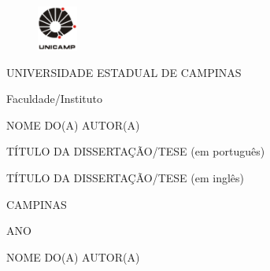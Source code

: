 
\thispagestyle{empty}

\begin{figure}[t]
  \begin{flushleft}
  \includegraphics[width=50px,height=56px]{logo_unicamp.pdf}
  \end{flushleft}
\end{figure}

\begin{center}
UNIVERSIDADE ESTADUAL DE CAMPINAS

Faculdade/Instituto
\end{center}

\vspace{\fill}

\begin{center}
NOME DO(A) AUTOR(A)
\end{center}

\vspace{\fill}

\begin{center}
TÍTULO DA DISSERTAÇÃO/TESE (em português)
\end{center}

\vspace{\fill}

\begin{center}
TÍTULO DA DISSERTAÇÃO/TESE (em inglês)
\end{center}

\vspace{\fill}
\begin{center}
CAMPINAS

ANO
\end{center}

\newpage

\thispagestyle{empty}

\begin{center}
NOME DO(A) AUTOR(A)
\end{center}

\vspace{\fill} 

